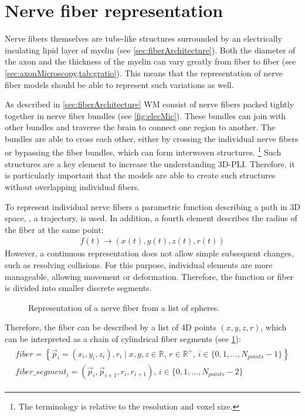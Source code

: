 \section{Nerve fiber representation}
\label{sec:nerve_fiber_representation}
%
Nerve fibers themselves are tube-like structures surrounded by an electrically insulating lipid layer of myelin (see \cref{sec:fiberArchitecture}).
Both the diameter of the axon and the thickness of the myelin can vary greatly from fiber to fiber (see \cref{sec:axonMicroscopy,tab:gratio}).
This means that the representation of nerve fiber models should be able to represent such variations as well.
\par
%
As described in \cref{sec:fiberArchitecture} \ac{WM} consist of nerve fibers packed tightly together in nerve fiber bundles (see \cref{fig:elecMic}).
These bundles can join with other bundles and traverse the brain to connect one region to another.
The bundles are able to cross each other, either by crossing the individual nerve fibers or bypassing the fiber bundles, which can form interwoven structures.
\footnote{The terminology  is relative to the resolution and voxel size.}
Such structures are a key element to increase the understanding \ac{3D-PLI}.
Therefore, it is particularly important that the models are able to create such structures without overlapping individual fibers.
\par
%
To represent individual nerve fibers a parametric function describing a path in 3D space, \ie{}, a trajectory, is used.
In addition, a fourth element describes the radius of the fiber at the same point:
% 
\begin{align}
f(t) \rightarrow (x(t),y(t), z(t), r(t))
\end{align}
% 
However, a continuous representation does not allow simple subsequent changes, such as resolving collisions.
For this purpose, individual elements are more manageable, allowing movement or deformation.
Therefore, the function or fiber is divided into smaller discrete segments.
%
\begin{figure}[!t]
    \setlength{\tikzwidth}{0.85\textwidth}
    \centering
	\caption[]{Representation of a nerve fiber from a list of spheres.}
	\label{fig:fiberReb}
\end{figure}
%
Therefore, the fiber can be described by a list of 4D points $(x,y,z,r)$, which can be interpreted as a chain of cylindrical fiber segments (see \cref{fig:fiberReb}):
\begin{align}
\begin{gathered}
\mathit{fiber} = \left\{ \vec{p}_i=(x_i,y_i,z_i), r_i \mid x,y,z \in \mathbb{R}, \, r \in \mathbb{R^+}, \, i \in \{0,1,...,N_{\mathit{points}}-1\}\right\} \\
\mathit{fiber\_segment}_i = (\vec{p}_i, \vec{p}_{i+1}, r_i, r_{i+1}), \, i \in \{0,1,...,N_{\mathit{points}}-2\}
\end{gathered}
\end{align}

